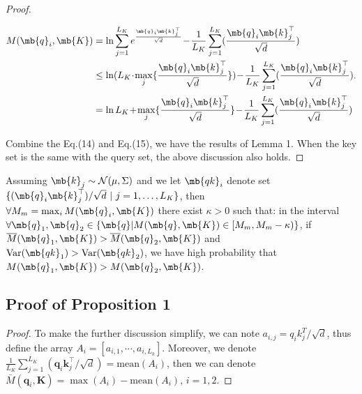 \begin{appendices}
\begin{proof}
\begin{small}
\begin{equation}
\begin{aligned}
    M(\mb{q}_i, \mb{K}) &= \ln \sum_{j=1}^{L_K} e^{\frac{{\mb{q}_i\mb{k}_j^{\top}}}{{\sqrt{d}}}} \!-\!\frac{1}{L_K} \sum_{j=1}^{L_K} (\frac{{\mb{q}_i\mb{k}_j^{\top}}}{\sqrt{d}}) \\
    & \leq \ln ( L_K \!\cdot\! \max_{j}\{\frac{{\mb{q}_i \mb{k}_j^{\top}}}{\sqrt{d}}\} )\!-\!\frac{1}{L_K} \sum_{j=1}^{L_K} (\frac{\mb{q}_i\mb{k}_j^{\top}}{\sqrt{d}}) \\
    & = \ln L_K \!+\! \max_{j}\{\frac{\mb{q}_i \mb{k}_j^{\top}}{\sqrt{d}}\}\!-\!
    \frac{1}{L_K} \sum_{j=1}^{L_K} (\frac{\mb{q}_i\mb{k}_j^{\top}}{\sqrt{d}})
\end{aligned}.
\end{equation}
\end{small}

Combine the Eq.(14) and Eq.(15), we have the results of Lemma 1. When the key set is the same with the query set, the above discussion also holds.
\end{proof}

\begin{proposition}
Assuming $\mb{k}_j \sim \mathcal{N} (\mu, \Sigma)$ and we let $\mb{qk}_{i}$ denote set $\{({\mb{q}_i\mb{k}_j^{\top}})/{\sqrt{d}} ~|~ j=1,\ldots,L_K\}$, then $\forall M_{m} = \max_{i} M(\mb{q}_i, \mb{K})$ there exist $\kappa > 0$ such that: in the interval $\forall \mb{q}_1, \mb{q}_2 \in \{ \mb{q} | M(\mb{q}, \mb{K}) \in [ M_{m},  M_{m} - \kappa)\}$, if $\overline{M} (\mb{q}_1, \mb{K}) > \overline{M} (\mb{q}_2, \mb{K})$ and~$\mathrm{Var}(\mb{qk}_{1}) > \mathrm{Var}(\mb{qk}_{2})$, we have high probability that $M(\mb{q}_1, \mb{K}) > M(\mb{q}_2, \mb{K})$.
\end{proposition}

\subsection{Proof of Proposition 1}
\label{sec:appendix.proof2}
\begin{proof}
To make the further discussion simplify, we can note $a_{i,j}={q_i k_j^T}/{\sqrt{d}}$, thus define the array $A_i = [a_{i,1},\cdots,a_{i,L_k}]$. Moreover, we denote $\frac{1}{L_{K}} \sum_{j=1}^{L_{K}} ({\mathbf{q}_{i} \mathbf{k}_{j}^{\top}}/{\sqrt{d}})=\mathrm{mean}(A_i)$, then we can denote $\bar{M}\left(\mathbf{q}_{i}, \mathbf{K}\right)=\max(A_i)-\mathrm{mean}(A_i)$, $i=1,2$.


\end{proof}
\end{appendices}
